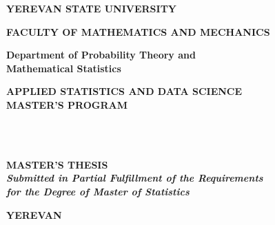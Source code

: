 \setmainfont{DejaVu Sans}

\begin{center}

\fontsize{18pt}{19.2pt} \textbf{\uppercase{Yerevan State University}}\vspace{11.5pt}

\fontsize{18pt}{16.8pt}  \textbf{\uppercase{Faculty of Mathematics and Mechanics
}}\\ 
\vfill

\fontsize{16pt}{16.8pt} \textbf { {Department of Probability Theory and \\ Mathematical Statistics}}\\

\vfill 
   
\fontsize{17.8pt}{16.8pt} \textbf { \uppercase{Applied Statistics and Data Science \\ Master's Program}}

\vfill


\fontsize{18pt}{21.6pt} \textbf{\MakeUppercase{\authorNameEng}}\\

\vfill
\fontsize{18pt}{21.6pt} \textbf{\MakeUppercase{\thesisTitleEng}}\\

\vfill

\fontsize{18pt}{36pt}\textbf{\uppercase{Master's Thesis
}}\\

\vfill
\fontsize{13.3pt}{16.8pt} \textbf{\textit{Submitted in Partial Fulfillment of the Requirements \\ for the Degree of Master of Statistics
\\}}

\vfill
\fontsize{13pt}{15.6pt}  \textbf{\uppercase{Yerevan \the\year}}
               
\end{center}
\thispagestyle{empty}
\pagebreak
